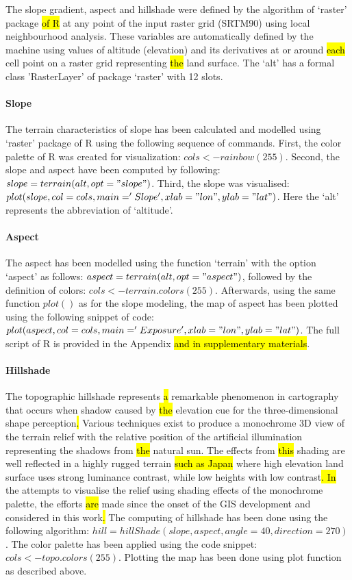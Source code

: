 \documentclass[land,article,submit,pdftex,moreauthors]{Definitions/mdpi}
\begin{document}
The slope gradient, aspect and hillshade were defined by the algorithm of\hl{ }‘raster’ package \hl{of R }at any point of the input raster grid (SRTM90) using local neighbourhood analysis. These variables are automatically defined by the machine using values of altitude (elevation) and its derivatives at or around \hl{each }cell point on a raster grid representing \hl{the }land surface. The ‘alt’ has a formal class 'RasterLayer' of package ‘raster’ with 12 slots.

\paragraph{Slope}
The terrain characteristics of slope has been calculated and modelled using ‘raster’ package of R using the following sequence of commands. First, the color palette of R was created for visualization: $cols <- rainbow(255)$. Second, the slope and aspect have been computed by following: $slope = terrain(alt, opt = "slope")$. Third, the slope was visualised: $plot(slope, col=cols, main='Slope', xlab = "lon", ylab = "lat")$. Here the ‘alt’ represents the abbreviation of ‘altitude’.

\paragraph{Aspect}
The aspect has been modelled using the function ‘terrain’ with the option ‘aspect’ as follows: $aspect = terrain(alt, opt = "aspect")$, followed by the definition of colors: $cols <- terrain.colors(255)$. Afterwards, using the same function $plot()$ as for the slope modeling, the map of aspect has been plotted using the following snippet of code: $plot(aspect, col=cols, main='Exposure', xlab = "lon", ylab = "lat")$. The full script of R is provided in the Appendix \hl{and in supplementary materials}.
 
 \paragraph{Hillshade} 
The topographic hillshade represents \hl{a} remarkable phenomenon in cartography that occurs when shadow caused by \hl{the }elevation cue for the three-dimensional shape perception\hl{. }Various techniques exist to produce a monochrome 3D view of the terrain relief with the relative position of the artificial illumination representing the shadows from \hl{the }natural sun. The effects from \hl{this }shading are well reflected in a highly rugged terrain\hl{ such as Japan} where high elevation land surface uses strong luminance contrast, while low heights with low contrast\hl{. In} the attempts to visualise the relief using shading effects of the monochrome palette, the efforts \hl{are} made since the onset of the GIS development and considered in this work\hl{. }The computing of hillshade has been done using the following algorithm: $hill = hillShade(slope, aspect, angle = 40, direction = 270)$. The color palette has been applied using the code snippet: $cols <- topo.colors(255)$. Plotting the map has been done using plot function as described above.
 
\end{document}
